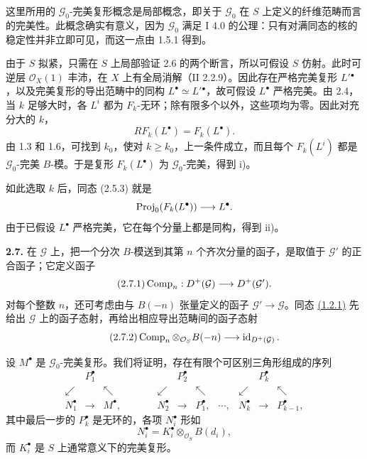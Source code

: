 这里所用的 \(\mathcal G_0\)-完美复形概念是局部概念，即关于 \(\mathcal G_0\) 在 \(S\) 上定义的纤维范畴而言的完美性。此概念确实有意义，因为 \(\mathcal G_0\) 满足 I 4.0 的公理：只有对满同态的核的稳定性并非立即可见，而这一点由 1.5.1 得到。

由于 \(S\) 拟紧，只需在 \(S\) 上局部验证 2.6 的两个断言，所以可假设 \(S\) 仿射。此时可逆层 \(\mathcal O_X(1)\) 丰沛，在 \(X\) 上有全局消解（II 2.2.9）。因此存在严格完美复形 \(L'{}^\bullet\)，以及完美复形的导出范畴中的同构 \(L^\bullet\simeq L'{}^\bullet\)，故可假设 \(L^\bullet\) 严格完美。由 2.4，当 \(k\) 足够大时，各 \(L^i\) 都为 \(F_k\)-无环；除有限多个以外，这些项均为零。因此对充分大的 \(k\)，
\[
 RF_k(L^\bullet)=F_k(L^\bullet).
\]
由 1.3 和 1.6，可找到 \(k_0\)，使对 \(k\geq k_0\)，上一条件成立，而且每个 \(F_k(L^i)\) 都是 \(\mathcal G_0\)-完美 \(B\)-模。于是复形 \(F_k(L^\bullet)\) 为 \(\mathcal G_0\)-完美，得到 i)。

如此选取 \(k\) 后，同态 (2.5.3) 就是
\[
 \operatorname{Proj}_0(F_k(L^\bullet))\longrightarrow L^\bullet.
\]
由于已假设 \(L^\bullet\) 严格完美，它在每个分量上都是同构，得到 ii)。

\noindent\textbf{2.7.}
在 \(\mathcal G\) 上，把一个分次 \(B\)-模送到其第 \(n\) 个齐次分量的函子，是取值于 \(\mathcal G'\) 的正合函子；它定义函子
\begin{equation}\tag{2.7.1}
  \operatorname{Comp}_n:D^+(\mathcal G)\longrightarrow D^+(\mathcal G').
\end{equation}
对每个整数 \(n\)，还可考虑由与 \(B(-n)\) 张量定义的函子 \(\mathcal G'\to\mathcal G\)。同态 \hyperlink{sga6.e06.eq.1-2-1}{(1.2.1)} 先给出 \(\mathcal G\) 上的函子态射，再给出相应导出范畴间的函子态射
\begin{equation}\tag{2.7.2}
  \operatorname{Comp}_n\otimes_{\mathcal O_S}B(-n)\longrightarrow
  \operatorname{id}_{D^+(\mathcal G)}.
\end{equation}

设 \(M^\bullet\) 是 \(\mathcal G_0\)-完美复形。我们将证明，存在有限个可区别三角形组成的序列
\[
\begin{array}{ccccccccccc}
& P_1^\bullet &&&& P_2^\bullet &&&& P_k^\bullet &\\
\swarrow && \nwarrow && \swarrow && \nwarrow && \swarrow && \nwarrow\\
N_1^\bullet & \longrightarrow & M^\bullet, & \qquad &
N_2^\bullet & \longrightarrow & P_1^\bullet, & \cdots, &
N_k^\bullet & \longrightarrow & P_{k-1}^\bullet,
\end{array}
\]
其中最后一步的 \(P_k^\bullet\) 是无环的，各项 \(N_i^\bullet\) 形如
\[
  N_i^\bullet=K_i^\bullet\otimes_{\mathcal O_S}B(d_i),
\]
而 \(K_i^\bullet\) 是 \(S\) 上通常意义下的完美复形。

